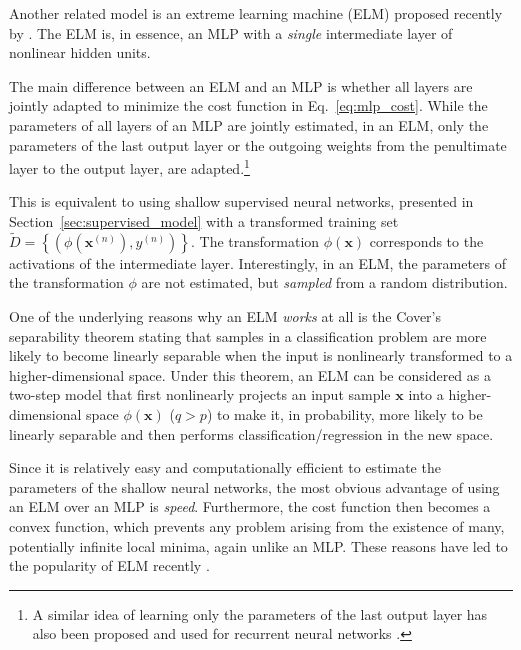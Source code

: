 \documentclass{now}
\newcommand{\vect}[1]{\mathbf{#1}}
\newcommand{\vx}[0]{\vect{x}}
\begin{document}
Another related model is an extreme learning machine
(ELM) proposed
recently by \citet{Huang2006}. The ELM is, in essence, an
MLP with a \textit{single} intermediate layer of nonlinear
hidden units.

The main difference between an ELM and an MLP is whether all
layers are jointly adapted to minimize the cost function in
Eq.~\eqref{eq:mlp_cost}. While the parameters of all layers
of an MLP are jointly estimated, in an ELM, only the
parameters of the last output layer or the outgoing weights
from the penultimate layer to the output layer, are
adapted.\footnote{
A similar idea of learning only the parameters of the last
output layer has also been proposed and used for
recurrent neural networks \citep[see, e.g.,][]{Jaeger2009}.
}

This is equivalent to using shallow supervised neural
networks, presented in Section~\ref{sec:supervised_model}
with a transformed training set $\tilde{D}=\left\{ \left(
\phi(\vx^{(n)}), y^{(n)} \right) \right\}$. The
transformation $\phi(\vx)$ corresponds to the activations of
the intermediate layer.  Interestingly, in an ELM, the
parameters of the transformation $\phi$ are not estimated,
but \textit{sampled} from a random distribution.

One of the underlying reasons why an ELM \textit{works} at
all is the Cover's separability theorem
\citep{Cover1965}
stating that samples in a
classification problem are more likely to become linearly
separable when the input is nonlinearly transformed to a
higher-dimensional space. Under this theorem, an ELM can be
considered as a two-step model that first nonlinearly
projects an input sample $\vx$ into a higher-dimensional
space $\phi(\vx)$ ($q > p$) to make it, in probability, more
likely to be linearly separable and then performs
classification/regression in the new space.

Since it is relatively easy and computationally efficient to
estimate the parameters of the shallow neural networks, the
most obvious advantage of using an ELM over an MLP is
\textit{speed}. Furthermore, the cost function then
becomes a convex function, which prevents any problem
arising from the existence of many, potentially infinite
local minima, again unlike an MLP. These reasons have led
to the popularity of ELM recently \citep{Huang2011}.



\end{document}
